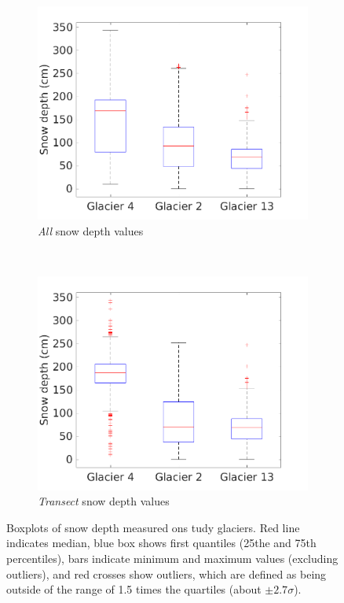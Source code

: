 \documentclass[12pt]{article}
\begin{document}
\begin{figure}[H]
    \centering
    \begin{subfigure}[b]{0.48\textwidth}
        \includegraphics[width=\textwidth]{box_depth_wZZ.png}
        \caption{ \textit{All} snow depth values}
        \label{fig:box_depth_wZZ}
    \end{subfigure}
    ~
    \begin{subfigure}[b]{0.48\textwidth}
        \includegraphics[width=\textwidth]{box_depth_noZZ.png}
        \caption{\textit{Transect} snow depth values}
        \label{fig:box_depth_noZZ}
    \end{subfigure}

    \caption{Boxplots of snow depth measured ons tudy glaciers. Red line indicates median, blue box shows first quantiles (25the and 75th percentiles), bars indicate minimum and maximum values (excluding outliers), and red crosses show outliers, which are defined as being outside of the range of 1.5 times the quartiles (about $\pm2.7\sigma$).}
    \label{fig:box_depth}
\end{figure}
\end{document}
